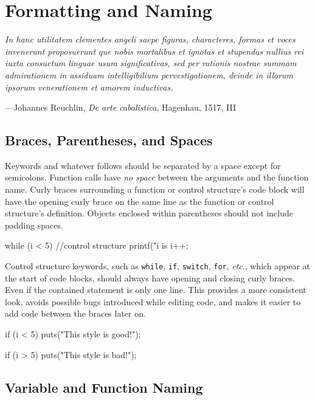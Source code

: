 \documentclass[11pt]{article}
\begin{document}
\section{Formatting and Naming}

\textwidth
\epigraph{\emph{ In hanc utilitatem clementes angeli saepe figuras,
characteres, formas et voces invenerunt proposuerunt que nobis
mortalibus et ignotas et stupendas nullius rei iuxta consuetum linguae
usum significativas, sed per rationis nostrae summam admirationem in
assiduam intelligibilium pervestigationem, deinde in illorum ipsorum
venerationem et amorem inductivas.}}{---Johannes Reuchlin, \emph{De arte
cabalistica}, Hagenhau, 1517, III}


\subsection{Braces, Parentheses, and Spaces}

Keywords and whatever follows should be separated by a space except for
semicolons. Function calls have \emph{no space} between
the arguments and the function name.
Curly braces surrounding a function or control structure's code block will have
the opening curly brace on the same line as the function or control structure's
definition. Objects enclosed within parentheses should not include padding spaces.

\begin{clisting}{}
while (i < 5) {             //control structure
    printf("i is %
    i++;
}
\end{clisting}

Control structure keywords, such as \texttt{while}, \texttt{if},
\texttt{switch}, \texttt{for}, \emph{etc}., which appear at the start of code
blocks, should always have opening and closing curly braces. Even if the
contained statement is only one line. This provides a more consistent look,
avoids possible bugs introduced while editing code, and makes it easier to add
code between the braces later on.

\begin{clisting}{}
if (i < 5) {
    puts("This style is good!");
}

if (i > 5)
    puts("This style is bad!");
\end{clisting}


\subsection{Variable and Function Naming}
\end{document}
